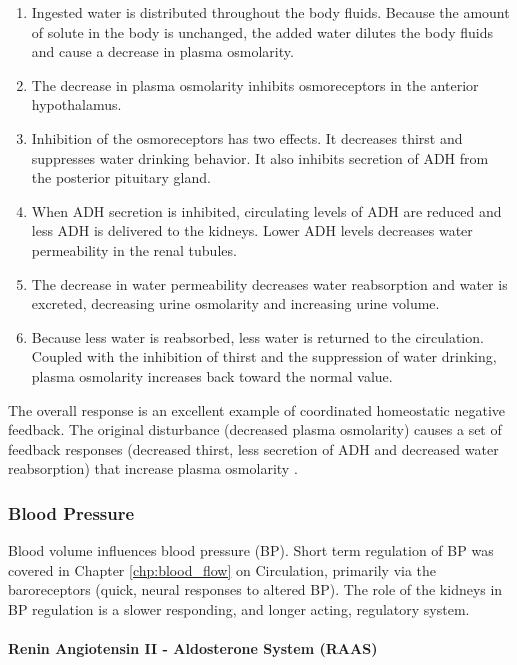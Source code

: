 \begin{enumerate}
\item  Ingested water is distributed throughout the body fluids. Because the amount of solute in the body is unchanged, the added water dilutes the body fluids and cause a decrease in plasma osmolarity. 
\item The decrease in plasma osmolarity inhibits osmoreceptors in the anterior hypothalamus. 
\item Inhibition of the osmoreceptors has two effects. It decreases thirst and suppresses water drinking behavior. It also inhibits secretion of ADH from the posterior pituitary gland. 
\item When ADH secretion is inhibited, circulating levels of ADH are reduced and less ADH is delivered to the kidneys. Lower ADH levels decreases water permeability in the renal tubules. 
\item The decrease in water permeability decreases water reabsorption and water is excreted, decreasing urine osmolarity and increasing urine volume. 
\item Because less water is reabsorbed, less water is returned to the circulation. Coupled with the inhibition of thirst and the suppression of water drinking, plasma osmolarity increases back toward the normal value.
\end{enumerate}

The overall response is an excellent example of coordinated homeostatic negative feedback.  The original disturbance (decreased plasma osmolarity) causes a set of feedback responses (decreased thirst, less secretion of ADH and decreased water reabsorption) that increase plasma osmolarity \cite{hall_guyton_2020}.

\subsubsection{Blood Pressure}

Blood volume influences blood pressure (BP). Short term regulation of BP was covered in Chapter \ref{chp:blood_flow} on Circulation, primarily via the baroreceptors (quick, neural responses to altered BP). The role of the kidneys in BP regulation is a slower responding, and longer acting, regulatory system.

\paragraph{Renin Angiotensin II - Aldosterone System (RAAS)}

